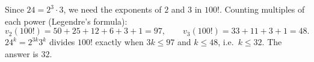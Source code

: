 Since $24=2^3\cdot3$, we need the exponents of $2$ and $3$ in $100!$. Counting multiples of each power (Legendre's formula):
\[
v_2(100!)=50+25+12+6+3+1=97,\qquad v_3(100!)=33+11+3+1=48 .
\]
$24^k=2^{3k}3^k$ divides $100!$ exactly when $3k\le97$ and $k\le48$, i.e.\ $k\le32$. The answer is $\boxed{32}$.
